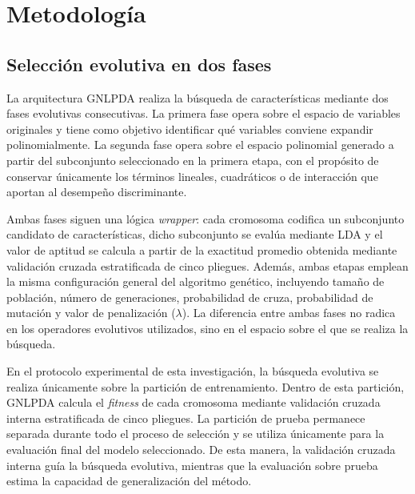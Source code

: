 
\chapter{Metodología}
\label{chap:Metodología}

\section{Selección evolutiva en dos fases}


La arquitectura GNLPDA realiza la búsqueda de características mediante dos fases
evolutivas consecutivas. La primera fase opera sobre el espacio de variables originales y tiene como objetivo identificar qué variables conviene expandir polinomialmente. La segunda fase opera sobre el espacio polinomial generado a partir del subconjunto seleccionado en la
primera etapa, con el propósito de conservar únicamente los términos lineales, cuadráticos o
de interacción que aportan al desempeño discriminante.

Ambas fases siguen una lógica \textit{wrapper}: cada cromosoma codifica un subconjunto candidato de características, dicho subconjunto se evalúa mediante LDA y el valor de aptitud se calcula a partir de la exactitud promedio obtenida mediante validación cruzada estratificada de cinco pliegues. Además, ambas etapas emplean la misma configuración general del algoritmo genético, incluyendo tamaño de población, número de generaciones, probabilidad de cruza, probabilidad de mutación y valor de penalización ($\lambda$). La diferencia entre ambas fases no radica en los operadores evolutivos utilizados, sino en el espacio sobre el que se realiza la búsqueda.

En el protocolo experimental de esta investigación, la búsqueda evolutiva se realiza únicamente sobre la partición de entrenamiento. Dentro de esta partición, GNLPDA calcula el \textit{fitness} de cada cromosoma mediante validación cruzada interna estratificada de cinco pliegues. La partición de prueba permanece separada durante todo el proceso de selección y se utiliza únicamente para la evaluación final del modelo seleccionado. De esta manera, la validación cruzada interna guía la búsqueda evolutiva, mientras que la evaluación sobre prueba estima la capacidad de generalización del método.

